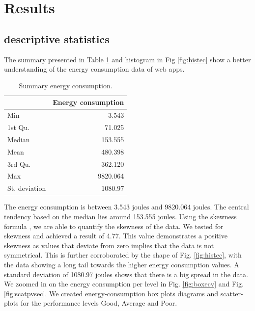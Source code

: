 \section{Results} 
\subsection{descriptive statistics}
The summary presented in Table \ref{tab:table3} and histogram in Fig \ref{fig:histec} show a better understanding of the energy consumption data of web apps. 

\begin{table}[h!]
  \begin{center}
    \begin{tabular}{l|r} %
      \textbf{  } & \textbf{Energy consumption} \\
      \hline
      Min & 3.543\\
      1st Qu. & 71.025\\
      Median & 153.555\\
      Mean & 480.398 \\
      3rd Qu. & 362.120 \\
      Max & 9820.064 \\
      St. deviation & 1080.97\\
    \end{tabular}
        \caption{Summary energy consumption.}
           \label{tab:table3}
  \end{center}
\end{table}



The energy consumption is between 3.543 joules and 9820.064 joules. The central tendency based on the median lies around 153.555 joules. Using the skewness formula \cite{Rep:e1071}, we are able to quantify the skewness of the data. We tested for skewness and achieved a result of 4.77. This value demonstrates a positive skewness as values that deviate from zero implies that the data is not symmetrical. This is further corroborated by the shape of Fig. \ref{fig:histec}, with the data showing a long tail towards the higher energy consumption values. A standard deviation of 1080.97 joules shows that there is a big spread in the data. We zoomed in on the energy consumption per level in Fig. \ref{fig:boxecv} and Fig. \ref{fig:scatpvsec}. We created energy-consumption box plots diagrams and scatter-plots for the performance levels Good, Average and Poor.


